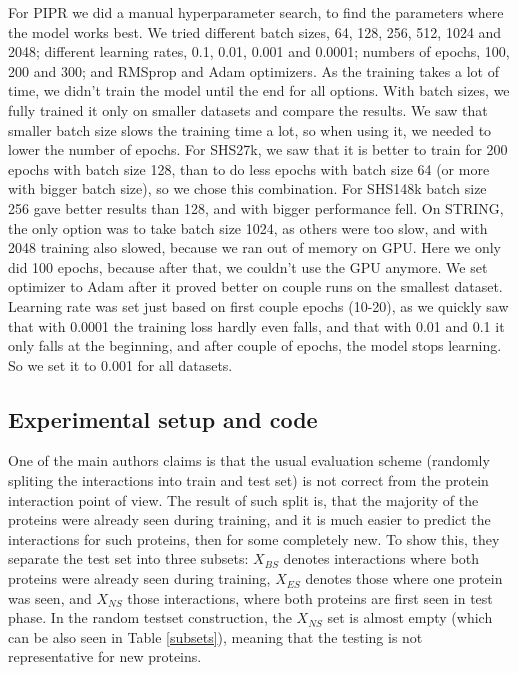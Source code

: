 For PIPR we did a manual hyperparameter search, to find the parameters where the model works best. We tried different batch sizes, 64, 128, 256, 512, 1024 and 2048; different learning rates, 0.1, 0.01, 0.001 and 0.0001; numbers of epochs, 100, 200 and 300; and RMSprop and Adam optimizers. 
As the training takes a lot of time, we didn't train the model until the end for all options. With batch sizes, we fully trained it only on smaller datasets and compare the results. We saw that smaller batch size slows the training time a lot, so when using it, we needed to lower the number of epochs. For SHS27k, we saw that it is better to train for 200 epochs with batch size 128, than to do less epochs with batch size 64 (or more with bigger batch size), so we chose this combination. For SHS148k batch size 256 gave better results than 128, and with bigger performance fell. On STRING, the only option was to take batch size 1024, as others were too slow, and with 2048 training also slowed, because we ran out of memory on GPU. Here we only did 100 epochs, because after that, we couldn't use the GPU anymore.
We set optimizer to Adam after it proved better on couple runs on the smallest dataset.
Learning rate was set just based on first couple epochs (10-20), as we quickly saw that with 0.0001 the training loss hardly even falls, and that with 0.01 and 0.1 it only falls at the beginning, and after couple of epochs, the model stops learning. So we set it to 0.001 for all datasets.

\subsection{Experimental setup and code}
One of the main authors claims is that the usual evaluation scheme (randomly spliting the interactions into train and test set) is not correct from the protein interaction point of view. The result of such split is, that the majority of the proteins were already seen during training, and it is much easier to predict the interactions for such proteins, then for some completely new. To show this, they separate the test set into three subsets: $X_{BS}$ denotes interactions where both proteins were already seen during training, $X_{ES}$ denotes those where one protein was seen, and $X_{NS}$ those interactions, where both proteins are first seen in test phase. In the random testset construction, the $X_{NS}$ set is almost empty (which can be also seen in Table \ref{subsets}), meaning that the testing is not representative for new proteins.

